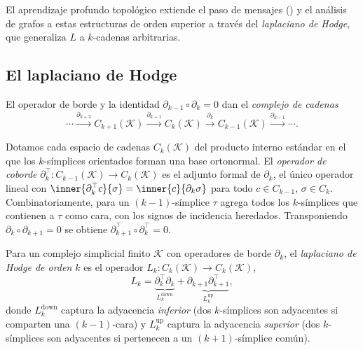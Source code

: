 El aprendizaje profundo topol\'ogico extiende el paso de mensajes
() y el an\'alisis de grafos a estas estructuras de orden
superior a trav\'es del \emph{laplaciano de Hodge}, que generaliza $L$ a
$k$-cadenas arbitrarias.

\subsection{El laplaciano de Hodge}
\label{sec:graphs:hodge}

El operador de borde y la identidad $\partial_{k-1} \circ \partial_k = 0$ dan el
\emph{complejo de cadenas}
\[
  \cdots \xrightarrow{\partial_{k+2}} C_{k+1}(\mathcal{K})
    \xrightarrow{\partial_{k+1}} C_k(\mathcal{K})
    \xrightarrow{\partial_k} C_{k-1}(\mathcal{K})
    \xrightarrow{\partial_{k-1}} \cdots .
\]

\begin{definition}
\label{def:graphs:coboundary}
Dotamos cada espacio de cadenas $C_k(\mathcal{K})$ del producto interno est\'andar
en el que los $k$-s\'implices orientados forman una base ortonormal. El
\emph{operador de coborde}
$\partial_k^\top \colon C_{k-1}(\mathcal{K}) \to C_k(\mathcal{K})$ es el adjunto
formal de $\partial_k$, el \'unico operador lineal con
$\inner{\partial_k^\top c}{\sigma} = \inner{c}{\partial_k \sigma}$ para todo
$c \in C_{k-1}$, $\sigma \in C_k$. Combinatoriamente, para un
$(k{-}1)$-s\'implice $\tau$ agrega todos los $k$-s\'implices que contienen a
$\tau$ como cara, con los signos de incidencia heredados. Transponiendo
$\partial_k \circ \partial_{k+1} = 0$ se obtiene
$\partial_{k+1}^\top \circ \partial_k^\top = 0$.
\end{definition}

\begin{definition}
\label{def:graphs:hodge}
Para un complejo simplicial finito $\mathcal{K}$ con operadores de borde
$\partial_k$, el \emph{laplaciano de Hodge de orden $k$} es el operador
$L_k \colon C_k(\mathcal{K}) \to C_k(\mathcal{K})$,
\[
  L_k = \underbrace{\partial_k^\top \partial_k}_{L_k^{\mathrm{down}}}
      + \underbrace{\partial_{k+1} \partial_{k+1}^\top}_{L_k^{\mathrm{up}}},
\]
donde $L_k^{\mathrm{down}}$ captura la adyacencia \emph{inferior} (dos
$k$-s\'implices son adyacentes si comparten una $(k{-}1)$-cara) y
$L_k^{\mathrm{up}}$ captura la adyacencia \emph{superior} (dos $k$-s\'implices son
adyacentes si pertenecen a un $(k{+}1)$-s\'implice com\'un).
\end{definition}

